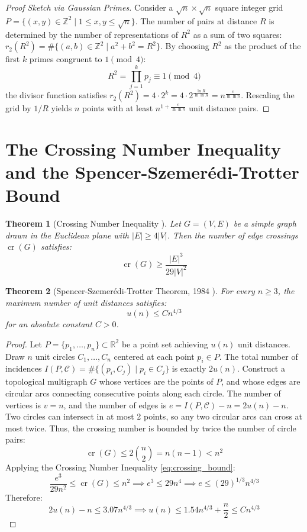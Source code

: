 \documentclass[11pt,a4paper]{article}
\newtheorem{theorem}{Theorem}[section]
\theoremstyle{definition}
\begin{document}
\begin{proof}[Proof Sketch via Gaussian Primes]
Consider a $\sqrt{n} \times \sqrt{n}$ square integer grid $P = \{ (x, y) \in \mathbb{Z}^2 \mid 1 \le x, y \le \sqrt{n} \}$.
The number of pairs at distance $R$ is determined by the number of representations of $R^2$ as a sum of two squares: $r_2(R^2) = \#\{(a, b) \in \mathbb{Z}^2 \mid a^2 + b^2 = R^2\}$.
By choosing $R^2$ as the product of the first $k$ primes congruent to $1 \pmod 4$:
\[ R^2 = \prod_{j=1}^k p_j \equiv 1 \pmod 4 \]
the divisor function satisfies $r_2(R^2) = 4 \cdot 2^k = 4 \cdot 2^{\frac{\ln R}{\ln \ln R}} = n^{\frac{c}{\ln \ln n}}$.
Rescaling the grid by $1/R$ yields $n$ points with at least $n^{1 + \frac{c}{\ln \ln n}}$ unit distance pairs.
\end{proof}

\section{The Crossing Number Inequality and the Spencer-Szemer\'edi-Trotter Bound}

\begin{theorem}[Crossing Number Inequality \cite{ajtai1982, leighton1983}]\label{thm:crossing}
Let $G = (V, E)$ be a simple graph drawn in the Euclidean plane with $|E| \ge 4 |V|$.
Then the number of edge crossings $\operatorname{cr}(G)$ satisfies:
\begin{equation}\label{eq:crossing_bound}
\operatorname{cr}(G) \ge \frac{|E|^3}{29 |V|^2}
\end{equation}
\end{theorem}

\begin{theorem}[Spencer-Szemer\'edi-Trotter Theorem, 1984 \cite{spencer1984}]\label{thm:sst}
For every $n \ge 3$, the maximum number of unit distances satisfies:
\begin{equation}\label{eq:sst_bound}
u(n) \le C n^{4/3}
\end{equation}
for an absolute constant $C > 0$.
\end{theorem}

\begin{proof}
Let $P = \{p_1, \dots, p_n\} \subset \mathbb{R}^2$ be a point set achieving $u(n)$ unit distances.
Draw $n$ unit circles $C_1, \dots, C_n$ centered at each point $p_i \in P$.
The total number of incidences $I(P, \mathcal{C}) = \#\{(p_i, C_j) \mid p_i \in C_j\}$ is exactly $2 u(n)$.
Construct a topological multigraph $G$ whose vertices are the points of $P$, and whose edges are circular arcs connecting consecutive points along each circle.
The number of vertices is $v = n$, and the number of edges is $e = I(P, \mathcal{C}) - n = 2 u(n) - n$.
Two circles can intersect in at most 2 points, so any two circular arcs can cross at most twice.
Thus, the crossing number is bounded by twice the number of circle pairs:
\[ \operatorname{cr}(G) \le 2 \binom{n}{2} = n(n - 1) < n^2 \]
Applying the Crossing Number Inequality \eqref{eq:crossing_bound}:
\[ \frac{e^3}{29 n^2} \le \operatorname{cr}(G) \le n^2 \implies e^3 \le 29 n^4 \implies e \le (29)^{1/3} n^{4/3} \]
Therefore:
\[ 2 u(n) - n \le 3.07 n^{4/3} \implies u(n) \le 1.54 n^{4/3} + \frac{n}{2} \le C n^{4/3} \]
\end{proof}
\end{document}
